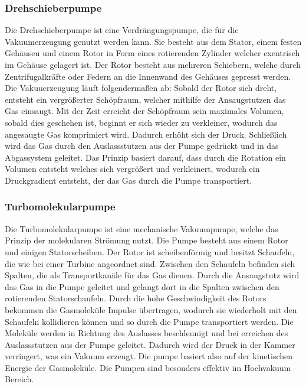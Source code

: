 \subsubsection{Drehschieberpumpe}


Die Drehschieberpumpe ist eine Verdrängungspumpe, die für die Vakuumerzeugung genutzt werden kann.
Sie besteht aus dem Stator, einem festen Gehäuseu und einem Rotor in Form eines rotierenden
Zylinder welcher exentrisch im Gehäuse gelagert ist. Der Rotor besteht aus mehreren Schiebern, welche durch Zentrifugalkräfte 
oder Federn an die Innenwand des Gehäuses gepresst werden. Die Vakuuerzeugung läuft folgendermaßen ab:
Sobald der Rotor sich dreht, entsteht ein vergrößerter Schöpfraum, welcher mithilfe der Ansaugstutzen das Gas
einsaugt. Mit der Zeit erreicht der Schöpfraum sein maximales Volumen, sobald dies geschehen ist, beginnt er sich wieder zu 
verkleiner, wodurch das angesaugte Gas komprimiert wird. Dadurch erhöht sich der Druck. Schließlich wird das Gas durch den Auslassstutzen 
aus der Pumpe gedrückt und in das Abgassystem geleitet. Das Prinzip basiert darauf, dass durch die Rotation ein Volumen entsteht welches sich vergrößert 
und verkleinert, wodurch ein Druckgradient entsteht, der das Gas durch die Pumpe transportiert.


\subsubsection{Turbomolekularpumpe}

Die Turbomolekularpumpe ist eine mechanische Vakuumpumpe, welche das Prinzip der molekularen Strömung nutzt.
Die Pumpe besteht aus einem Rotor und einigen Statorscheiben. Der Rotor ist scheibenförmig und besitzt Schaufeln, die wie bei einer Turbine angeordnet sind.
Zwischen den Schaufeln befinden sich Spalten, die als Transportkanäle für das Gas dienen.
Durch die Ansaugstutz wird das Gas in die Pumpe geleitet und gelangt dort in die Spalten zwischen den rotierenden Statorschaufeln. Durch die
hohe Geschwindigkeit des Rotors bekommen die Gasmoleküle Impulse übertragen, wodurch sie wiederholt mit den Schaufeln kollidieren können und so durch
die Pumpe transportiert werden. Die Moleküle werden in Richtung des Auslasses beschleunigt und bei erreichen des Auslassstutzen aus der Pumpe geleitet.
Dadurch wird der Druck in der Kammer verringert, was ein Vakuum erzeugt.
Die pumpe basiert also auf der kinetischen Energie der Gasmoleküle. Die Pumpen sind besonders effektiv im Hochvakuum Bereich.


